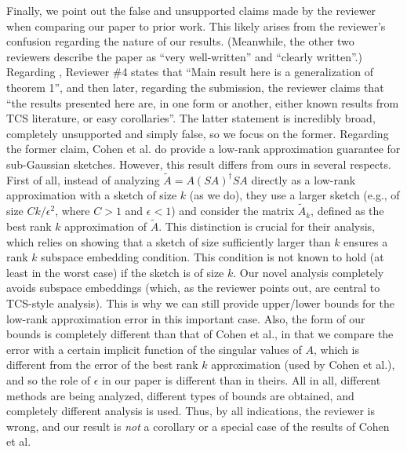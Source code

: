 \documentclass{article}
\begin{document}
Finally, we point out the false and unsupported claims made by the
reviewer when comparing our paper to prior work.  This
likely arises from the reviewer's confusion regarding the nature of our results. (Meanwhile, the other two reviewers describe the paper as
``very well-written'' and ``clearly written''.)
Regarding \cite{optimal-matrix-product}, Reviewer \#4 states
that ``Main result here is a generalization of theorem 1'', and then
later, regarding the submission, the reviewer claims that ``the results presented here are, in
one form or another, either known results from TCS literature, or easy
corollaries''. The latter statement is incredibly broad, completely
unsupported and simply false, so we focus on the former. Regarding the former claim, Cohen et al. do provide a
low-rank approximation guarantee for sub-Gaussian sketches. However,
this result differs from ours in several respects. First of
all, instead of analyzing $\tilde A=A(SA)^\dagger SA$ directly as a
low-rank approximation with a sketch of size
$k$ (as we do), they use a larger sketch
(e.g., of size $C k/\epsilon^2$, where $C>1$ and $\epsilon< 1$) and
consider the matrix
$\tilde A _k$, defined as the best rank $k$ approximation of $\tilde
A$. This distinction is crucial for their analysis, which relies on
showing that a sketch of size sufficiently larger than $k$ ensures
a rank $k$ subspace embedding condition. This condition is not known to hold
(at least in the worst case) if the sketch is of size $k$. Our
novel analysis completely avoids subspace embeddings (which, as the reviewer points out, are central to TCS-style analysis).  This is why we can still provide
upper/lower bounds for the low-rank approximation error in this
important case. Also, the form of our bounds is completely different than that
of Cohen et al., in that we compare the error with a certain implicit
function of the singular values of $A$, which is different from the
error of the best rank $k$ approximation (used by Cohen et al.), and
so the role of $\epsilon$ in our paper is different than in
theirs. All in all, different methods are being analyzed, different types of
bounds are obtained, and completely different analysis is
used. Thus, by all indications, the reviewer is wrong, and our result is \emph{not} a corollary or a special case
of the results of Cohen et al.


\vspace{-.7\baselineskip}
\renewcommand\refname{\normalsize References}
{\scriptsize
\setlength{\bibsep}{0pt plus 0.2ex}


}
\end{document}
